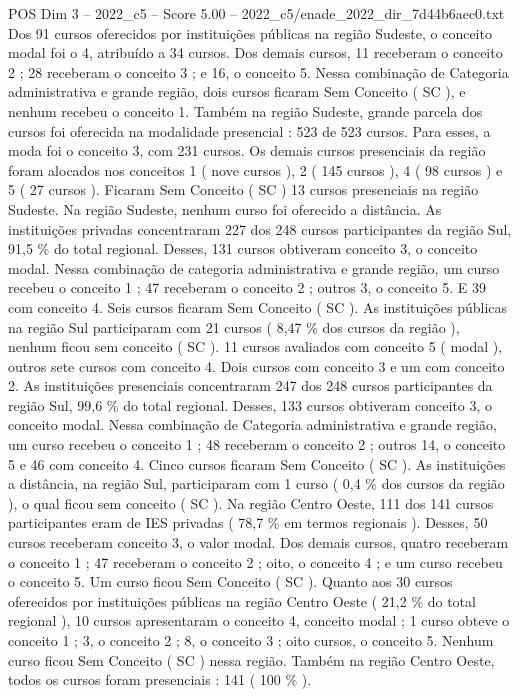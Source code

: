 \begin{textsample}{POS Dim 3 – 2022\_c5 – Score 5.00 – 2022\_c5/enade\_2022\_dir\_7d44b6aec0.txt}
Dos 91 cursos oferecidos por instituições públicas na região Sudeste, o conceito modal foi o 4, atribuído a 34 cursos.
Dos demais cursos, 11 receberam o conceito 2 ; 28 receberam o conceito 3 ; e 16, o conceito 5.
Nessa combinação de Categoria administrativa e grande região, dois cursos ficaram Sem Conceito ( SC ), e nenhum recebeu o conceito 1.
Também na região Sudeste, grande parcela dos cursos foi oferecida na modalidade presencial : 523 de 523 cursos.
Para esses, a moda foi o conceito 3, com 231 cursos.
Os demais cursos presenciais da região foram alocados nos conceitos 1 ( nove cursos ), 2 ( 145 cursos ), 4 ( 98 cursos ) e 5 ( 27 cursos ).
Ficaram Sem Conceito ( SC ) 13 cursos presenciais na região Sudeste.
Na região Sudeste, nenhum curso foi oferecido a distância.
As instituições privadas concentraram 227 dos 248 cursos participantes da região Sul, 91,5 \% do total regional.
Desses, 131 cursos obtiveram conceito 3, o conceito modal.
Nessa combinação de categoria administrativa e grande região, um curso recebeu o conceito 1 ; 47 receberam o conceito 2 ; outros 3, o conceito 5.
E 39 com conceito 4.
Seis cursos ficaram Sem Conceito ( SC ).
As instituições públicas na região Sul participaram com 21 cursos ( 8,47 \% dos cursos da região ), nenhum ficou sem conceito ( SC ). 11 cursos avaliados com conceito 5 ( modal ), outros sete cursos com conceito 4.
Dois cursos com conceito 3 e um com conceito 2.
As instituições presenciais concentraram 247 dos 248 cursos participantes da região Sul, 99,6 \% do total regional.
Desses, 133 cursos obtiveram conceito 3, o conceito modal.
Nessa combinação de Categoria administrativa e grande região, um curso recebeu o conceito 1 ; 48 receberam o conceito 2 ; outros 14, o conceito 5 e 46 com conceito 4.
Cinco cursos ficaram Sem Conceito ( SC ).
As instituições a distância, na região Sul, participaram com 1 curso ( 0,4 \% dos cursos da região ), o qual ficou sem conceito ( SC ).
Na região Centro Oeste, 111 dos 141 cursos participantes eram de IES privadas ( 78,7 \% em termos regionais ).
Desses, 50 cursos receberam conceito 3, o valor modal.
Dos demais cursos, quatro receberam o conceito 1 ; 47 receberam o conceito 2 ; oito, o conceito 4 ; e um curso recebeu o conceito 5.
Um curso ficou Sem Conceito ( SC ).
Quanto aos 30 cursos oferecidos por instituições públicas na região Centro Oeste ( 21,2 \% do total regional ), 10 cursos apresentaram o conceito 4, conceito modal ; 1 curso obteve o conceito 1 ; 3, o conceito 2 ; 8, o conceito 3 ; oito cursos, o conceito 5.
Nenhum curso ficou Sem Conceito ( SC ) nessa região.
Também na região Centro Oeste, todos os cursos foram presenciais : 141 ( 100 \% ).

\end{textsample}

